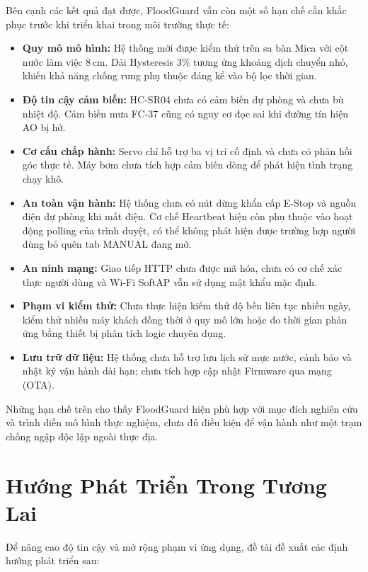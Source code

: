Bên cạnh các kết quả đạt được, FloodGuard vẫn còn một số hạn chế cần khắc phục trước khi triển khai trong môi trường thực tế:
\begin{itemize}
    \item \textbf{Quy mô mô hình:} Hệ thống mới được kiểm thử trên sa bàn Mica với cột nước làm việc $8\,\text{cm}$. Dải Hysteresis $3\%$ tương ứng khoảng dịch chuyển nhỏ, khiến khả năng chống rung phụ thuộc đáng kể vào bộ lọc thời gian.
    \item \textbf{Độ tin cậy cảm biến:} HC-SR04 chưa có cảm biến dự phòng và chưa bù nhiệt độ. Cảm biến mưa FC-37 cũng có nguy cơ đọc sai khi đường tín hiệu AO bị hở.
    \item \textbf{Cơ cấu chấp hành:} Servo chỉ hỗ trợ ba vị trí cố định và chưa có phản hồi góc thực tế. Máy bơm chưa tích hợp cảm biến dòng để phát hiện tình trạng chạy khô.
    \item \textbf{An toàn vận hành:} Hệ thống chưa có nút dừng khẩn cấp E-Stop và nguồn điện dự phòng khi mất điện. Cơ chế Heartbeat hiện còn phụ thuộc vào hoạt động polling của trình duyệt, có thể không phát hiện được trường hợp người dùng bỏ quên tab MANUAL đang mở.
    \item \textbf{An ninh mạng:} Giao tiếp HTTP chưa được mã hóa, chưa có cơ chế xác thực người dùng và Wi-Fi SoftAP vẫn sử dụng mật khẩu mặc định.
    \item \textbf{Phạm vi kiểm thử:} Chưa thực hiện kiểm thử độ bền liên tục nhiều ngày, kiểm thử nhiều máy khách đồng thời ở quy mô lớn hoặc đo thời gian phản ứng bằng thiết bị phân tích logic chuyên dụng.
    \item \textbf{Lưu trữ dữ liệu:} Hệ thống chưa hỗ trợ lưu lịch sử mực nước, cảnh báo và nhật ký vận hành dài hạn; chưa tích hợp cập nhật Firmware qua mạng (OTA).
\end{itemize}

Những hạn chế trên cho thấy FloodGuard hiện phù hợp với mục đích nghiên cứu và trình diễn mô hình thực nghiệm, chưa đủ điều kiện để vận hành như một trạm chống ngập độc lập ngoài thực địa.

\section{Hướng Phát Triển Trong Tương Lai}

Để nâng cao độ tin cậy và mở rộng phạm vi ứng dụng, đề tài đề xuất các định hướng phát triển sau:

